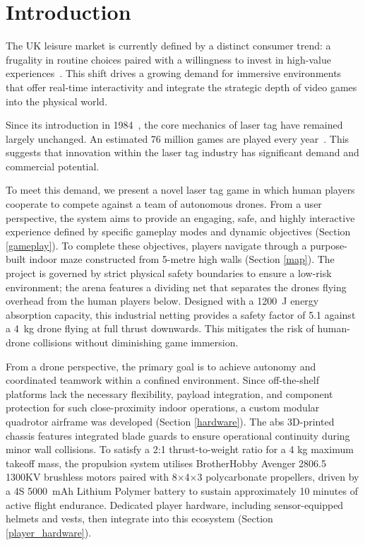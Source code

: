\documentclass{report_template_oxford}
\begin{document}
\section{Introduction}
The UK leisure market is currently defined by a distinct consumer trend: a frugality in routine choices paired with a willingness to invest in high-value experiences~\cite{arrowsmith2026leisure, deloitte2026leisure_report}. This shift drives a growing demand for immersive environments that offer real-time interactivity and integrate the strategic depth of video games into the physical world. 

Since its introduction in 1984~\cite{LaserTagHistory}, the core mechanics of laser tag have remained largely unchanged. An estimated 76 million games are played every year~\cite{trutneeLaserTag}. This suggests that innovation within the laser tag industry has significant demand and commercial potential.

To meet this demand, we present a novel laser tag game in which human players cooperate to compete against a team of autonomous drones. From a user perspective, the system aims to provide an engaging, safe, and highly interactive experience defined by specific gameplay modes and dynamic objectives (Section \ref{gameplay}). To complete these objectives, players navigate through a purpose-built indoor maze constructed from 5-metre high walls (Section \ref{map}). The project is governed by strict physical safety boundaries to ensure a low-risk environment; the arena features a dividing net that separates the drones flying overhead from the human players below. Designed with a 1200~J energy absorption capacity, this industrial netting provides a safety factor of 5.1 against a 4~kg drone flying at full thrust downwards. This mitigates the risk of human-drone collisions without diminishing game immersion.

From a drone perspective, the primary goal is to achieve autonomy and coordinated teamwork within a confined environment. Since off-the-shelf platforms lack the necessary flexibility, payload integration, and component protection for such close-proximity indoor operations, a custom modular quadrotor airframe was developed (Section \ref{hardware}). The \gls{abs} 3D-printed chassis features integrated blade guards to ensure operational continuity during minor wall collisions. To satisfy a 2:1 thrust-to-weight ratio for a 4 kg maximum takeoff mass, the propulsion system utilises BrotherHobby Avenger 2806.5 1300KV brushless motors paired with 8$\times$4$\times$3 polycarbonate propellers, driven by a 4S 5000~mAh Lithium Polymer battery to sustain approximately 10 minutes of active flight endurance. Dedicated player hardware, including sensor-equipped helmets and vests, then integrate into this ecosystem (Section \ref{player_hardware}).
\end{document}
